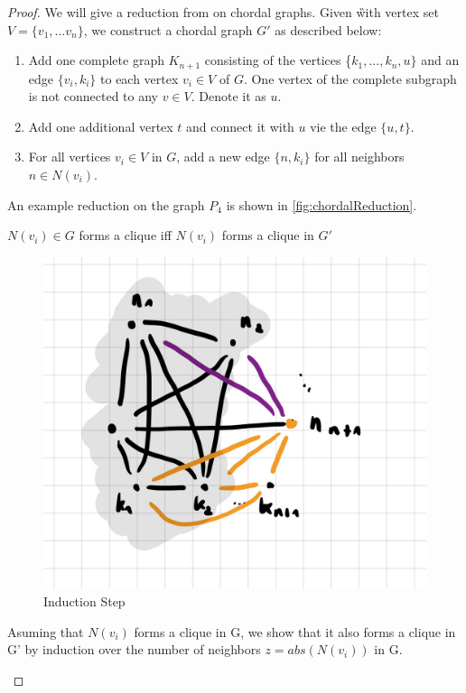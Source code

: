 \begin{proof}
    
    We will give a reduction from \dom on chordal graphs.
    Given \G with vertex set $V = \{v_1,...v_n\} $, we construct a chordal graph $G'$ as described below:
    \begin{enumerate}
        \item Add one complete graph $K_{n+1}$ consisting of the vertices \{$k_1,...,k_n,u\}$ and an edge $\{v_i, k_i\}$ to each vertex $v_i \in V$ of $G$. One vertex of the complete subgraph is not connected to any $v \in V$. Denote it as $u$.
        \item Add one additional vertex $t$ and connect it with $u$ vie the edge $\{u,t\}$.
        \item For all vertices $v_i \in V$ in $G$, add a new edge $\{n, k_i\}$ for all neighbors $n \in N(v_i)$.
    \end{enumerate}

    An example reduction on the graph $P_4$ is shown in  \cref{fig:chordalReduction}.

    \begin{corollary}\label{cliqueNeighbor}
       $N(v_i) \in G$ forms a clique iff $N(v_i)$ forms a clique in $G'$
    \end{corollary}

    \begin{subproof}

\begin{figure}[th]
    \includegraphics[scale=0.15]{pages/img/induction-step.jpg}
    \centering
    \caption{Induction Step}
    \label{fig:induction-step}
\end{figure}
        Asuming that $N(v_i)$ forms a clique in G, we show that it also forms a clique in G' by induction over the number of neighbors $z = abs(N(v_i))$ in G.


\end{subproof}
\end{proof}
